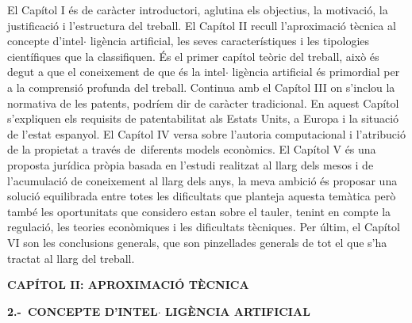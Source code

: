 \documentclass[12pt]{article}
\begin{document}
\vspace{\baselineskip}
\begin{justify}
El Capítol I és de caràcter introductori, aglutina els objectius, la motivació, la justificació i l’estructura del treball. El Capítol II recull l’aproximació tècnica al concepte d’intel$ \cdot $ ligència artificial, les seves característiques i les tipologies científiques que la classifiquen. És el primer capítol teòric del treball, això és degut a que el coneixement de que és la intel$ \cdot $ ligència artificial és primordial per a la comprensió profunda del treball. Continua amb el Capítol III on s’inclou la normativa de les patents, podríem dir de caràcter tradicional. En aquest Capítol s’expliquen els requisits de patentabilitat als Estats Units, a Europa i la situació de l’estat espanyol. El Capítol IV versa sobre l’autoria computacional i l’atribució de la propietat a través de\ diferents models econòmics.  El Capítol V és una proposta jurídica pròpia basada en l’estudi realitzat al llarg dels mesos i de l’acumulació de coneixement al llarg dels anys, la meva ambició és proposar una solució equilibrada entre totes les dificultats que planteja aquesta temàtica però també les oportunitats que considero estan sobre el tauler, tenint en compte la regulació, les teories econòmiques i les dificultats tècniques. Per últim, el Capítol VI son les conclusions generals, que son pinzellades generals de tot el que s’ha tractat al llarg del treball. 
\end{justify}\par


\vspace{\baselineskip}
\begin{Center}
{\fontsize{16pt}{19.2pt}\selectfont \textbf{CAPÍTOL II: APROXIMACIÓ TÈCNICA}\par}
\end{Center}\par


\vspace{\baselineskip}
\begin{justify}
\textbf{2.-\  CONCEPTE D’INTEL$ \cdot $ LIGÈNCIA ARTIFICIAL}
\end{justify}\par
\end{document}
